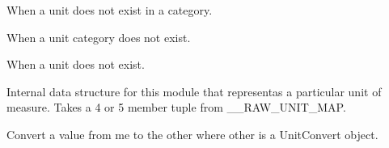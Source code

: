 \documentclass[letterpaper,10pt,english]{sphinxmanual}
\begin{document}

\begin{fulllineitems}
\label{\detokenize{ref/LIS/core/Units:TotalDepth.LIS.core.Units.ExceptionUnitsNoUnitInCategory}}
When a unit does not exist in a category.

\end{fulllineitems}


\begin{fulllineitems}
\label{\detokenize{ref/LIS/core/Units:TotalDepth.LIS.core.Units.ExceptionUnitsUnknownCategory}}
When a unit category does not exist.

\end{fulllineitems}


\begin{fulllineitems}
\label{\detokenize{ref/LIS/core/Units:TotalDepth.LIS.core.Units.ExceptionUnitsUnknownUnit}}
When a unit does not exist.

\end{fulllineitems}


\begin{fulllineitems}
\label{\detokenize{ref/LIS/core/Units:TotalDepth.LIS.core.Units.UnitConvert}}
Internal data structure for this module that representas a particular unit of measure.
Takes a 4 or 5 member tuple from \_\_RAW\_UNIT\_MAP.

\begin{fulllineitems}
\label{\detokenize{ref/LIS/core/Units:TotalDepth.LIS.core.Units.UnitConvert.convert}}
Convert a value from me to the other where other is a UnitConvert object.

\end{fulllineitems}


\end{fulllineitems}
\end{document}
